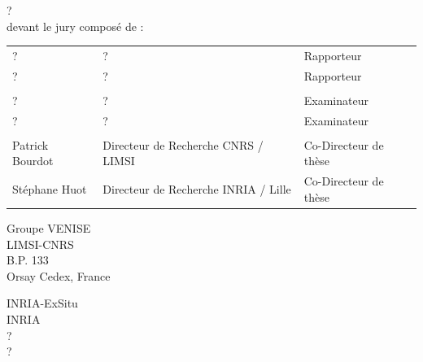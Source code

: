 \begin{titlepage}
?\\

devant le jury composé de :\\
\begin{center}
	\begin{tabular}{l l l}
	
	? 	&?		& Rapporteur\\ 
	?		& ? 		& Rapporteur\\ %
	& &\\
	?	& ?	 	& Examinateur\\ 
	?	& ?				& Examinateur\\ 
	& &\\	
	Patrick Bourdot 	& Directeur de Recherche CNRS / LIMSI				& Co-Directeur de thèse\\ 
	Stéphane Huot	& Directeur de Recherche INRIA / Lille				& Co-Directeur de thèse\\ 
		
	\end{tabular}
\end{center}


\setlength{\columnsep}{7mm}
\setlength{\columnseprule}{0pt}

\begin{multicols}{2} 
\small 
\noindent Groupe VENISE	\\	
\noindent LIMSI-CNRS					\\
\noindent B.P. 133				\\
 Orsay Cedex, France \\	

\columnbreak

\raggedleft INRIA-ExSitu \\
\noindent INRIA \\
\noindent ?  \\
\noindent ?
\end{multicols}



\end{titlepage}